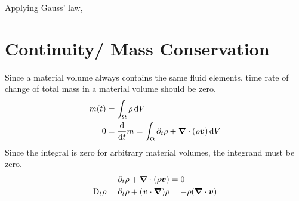 Applying Gauss' law,
\section{Continuity/ Mass Conservation}
Since a material volume always contains the same fluid elements, time rate of change of total mass in a material volume should be zero.
\begin{equation}
\begin{split}
    m(t) &= \int_{\Omega}\rho\,\mathrm{d} V \\
    0 &= \dfrac{\mathrm{d}}{\mathrm{d} t}m = \int_{\Omega}\partial_{t}\rho +
    \boldsymbol{\nabla}\cdot(\rho\boldsymbol{v}) \,\mathrm{d} V
\end{split}
\end{equation}
Since the integral is zero for arbitrary material volumes, the integrand must be zero.
\begin{equation}
\begin{split}
    \partial_{t}\rho + \boldsymbol{\nabla}\cdot(\rho\boldsymbol{v}) &= 0 \\
    \mathrm{D}_{t}\rho = \partial_{t}\rho + (\boldsymbol{v}\cdot\boldsymbol{\nabla})\rho &= -\rho(\boldsymbol{\nabla}\cdot\boldsymbol{v})
\end{split}
\end{equation}
